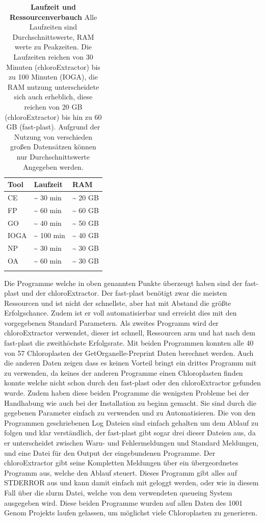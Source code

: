 \documentclass{scrartcl}
\begin{document}
\begin{table}[!h]
\caption[Laufzeit und Ressourcenverbrauch]{\textbf{Laufzeit und Ressourcenverbauch} Alle Laufzeiten sind Durchschnittswerte, RAM werte zu Peakzeiten. Die Laufzeiten reichen von 30 Minuten (chloroExtractor) bis zu 100 Minuten (IOGA), die RAM nutzung unterscheidete sich auch erheblich, diese reichen von 20 GB (chloroExtractor) bis hin zu 60 GB (fast-plast). Aufgrund der Nutzung von verschieden großen Datensätzen können nur Durchschnittswerte Angegeben werden.}
\begin{center}
\begin{tabular}{lll}
Tool & Laufzeit & RAM\\
\hline
CE & \textasciitilde{}  30 min & \textasciitilde{} 20 GB\\
FP & \textasciitilde{}  60 min & \textasciitilde{} 60 GB\\
GO & \textasciitilde{}  40 min & \textasciitilde{} 50 GB\\
IOGA & \textasciitilde{} 100 min & \textasciitilde{} 40 GB\\
NP & \textasciitilde{}  30 min & \textasciitilde{} 30 GB\\
OA & \textasciitilde{}  60 min & \textasciitilde{} 30 GB\\
 &  & \\
\end{tabular}
\end{center}
\end{table}
Die Programme welche in oben genannten Punkte überzeugt haben sind der fast-plast und der chloroExtractor. Der fast-plast benötigt zwar die 
meisten Ressourcen und ist nicht der schnellste, aber hat mit Abstand die größte Erfolgschance. Zudem ist er voll automatisierbar und erreicht 
dies mit den vorgegebenen Standard Parametern. Als zweites Programm wird der chloroExtractor verwendet, dieser ist schnell, Ressourcen arm und hat nach dem
fast-plast die zweithöchste Erfolgsrate. Mit beiden Programmen konnten alle 40 von 57 Chloroplasten der GetOrganelle-Preprint Daten berechnet werden.
Auch die anderen Daten zeigen dass es keinen Vorteil bringt ein drittes Programm mit zu verwenden, da keines der anderen Programme einen
Chloroplasten finden konnte welche nicht schon durch den fast-plast oder den chloroExtractor gefunden wurde. Zudem haben diese beiden Programme die wenigsten
Probleme bei der Handhabung wie auch bei der Installation zu beginn gemacht. Sie sind durch die gegebenen Parameter einfach zu verwenden und zu Automatisieren.
Die von den Programmen geschriebenen Log Dateien sind einfach gehalten um dem Ablauf zu folgen und klar verständlich, der fast-plast gibt sogar drei dieser
Dateien aus, da er unterscheidet zwischen Warn- und Fehlermeldungen und Standard Meldungen, und eine Datei für den Output der eingebundenen Programme. 
Der chloroExtractor gibt seine Kompletten Meldungen über ein übergeordnetes Programm aus, welche den Ablauf steuert. Dieses Programm gibt alles auf STDERROR aus und 
kann damit einfach mit geloggt werden, oder wie in diesem Fall über die slurm Datei, welche von dem verwendeten queueing System ausgegeben wird. 
Diese beiden Programme wurden auf allen Daten des 1001 Genom Projekts laufen gelassen, um möglichst viele Chloroplasten zu generieren. 
\end{document}

